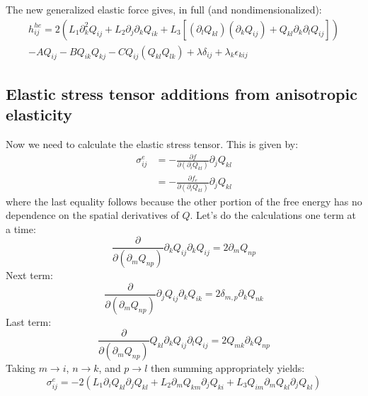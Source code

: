 \documentclass[reqno]{article}
\begin{document}
	The new generalized elastic force gives, in full (and nondimensionalized):
	\begin{multline}
		h^{he}_{ij} = 2 \left(
		L_1 \partial_k^2 Q_{ij}
		+ L_2 \partial_j \partial_k Q_{ik}
		+ L_3 \left[
		\left( \partial_l Q_{kl} \right)
		\left( \partial_k Q_{ij} \right)
		+ Q_{kl} \partial_k \partial_l Q_{ij}
		\right]
		\right) \\
		- A Q_{ij} - B Q_{ik}Q_{kj} - C Q_{ij} (Q_{kl}Q_{lk}) + \lambda\delta_{ij} + \lambda_k \epsilon_{kij}
	\end{multline}
	
	\subsection{Elastic stress tensor additions from anisotropic elasticity}
	Now we need to calculate the elastic stress tensor. 
	This is given by:
	\begin{equation}
	\begin{split}
		\sigma^e_{ij} 
		&= -\frac{\partial f}{\partial \left(\partial_i Q_{kl}\right)} \partial_j Q_{kl} \\
		&= -\frac{\partial f_e}{\partial \left(\partial_i Q_{kl}\right)} \partial_j Q_{kl}
	\end{split}
	\end{equation}
	where the last equality follows because the other portion of the free energy has no dependence on the spatial derivatives of $Q$. 
	Let's do the calculations one term at a time:
	\begin{equation}
		\frac{\partial}{\partial \left( \partial_m Q_{np} \right)}
		\partial_k Q_{ij} \partial_k Q_{ij}
		= 2 \partial_m Q_{np}
	\end{equation}
	Next term:
	\begin{equation}
		\frac{\partial}{\partial \left( \partial_m Q_{np} \right)}
		\partial_j Q_{ij} \partial_k Q_{ik}
		= 2 \delta_{m, p} \partial_k Q_{nk}
	\end{equation}
	Last term:
	\begin{equation}
		\frac{\partial}{\partial \left( \partial_m Q_{np} \right)}
		Q_{kl} \partial_k Q_{ij} \partial_l Q_{ij}
		= 2 Q_{mk} \partial_k Q_{np}
	\end{equation}
	Taking $m \to i$, $n \to k$, and $p \to l$ then summing appropriately yields:
	\begin{equation}
		\sigma^e_{ij} = -2\left(
		L_1 \partial_i Q_{kl} \partial_j Q_{kl}
		+ L_2 \partial_m Q_{km} \partial_j Q_{ki}
		+ L_3 Q_{im} \partial_m Q_{kl} \partial_j Q_{kl}
		\right)
	\end{equation}
	
\end{document}
